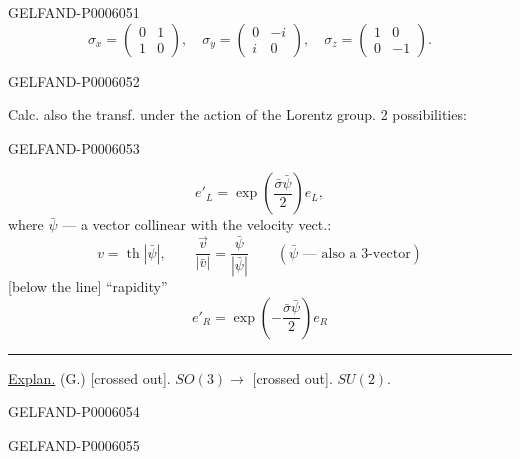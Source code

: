 \begin{GelfandAdjacentEvidence}{GELFAND-P000605}{1}
\[
\sigma_x=\begin{pmatrix}0&1\\1&0\end{pmatrix},\quad
\sigma_y=\begin{pmatrix}0&-i\\i&0\end{pmatrix},\quad
\sigma_z=\begin{pmatrix}1&0\\0&-1\end{pmatrix}.
\]
\end{GelfandAdjacentEvidence}
\begin{GelfandAdjacentEvidence}{GELFAND-P000605}{2}

Calc. also the transf. under the action of the Lorentz group. 2 possibilities:
\end{GelfandAdjacentEvidence}
\begin{GelfandAdjacentEvidence}{GELFAND-P000605}{3}

\[
e'_L=\exp\left(\frac{\bar\sigma\bar\psi}{2}\right)e_L,
\]
where \(\bar\psi\) — a vector collinear with the velocity vect.:
\[
v=\operatorname{th}|\bar\psi|,\qquad
\frac{\vec v}{|\bar v|}=\frac{\bar\psi}{|\bar\psi|}
\qquad(\bar\psi\text{ — also a 3-vector})
\]
[below the line] “rapidity”
\[
e'_R=\exp\left(-\frac{\bar\sigma\bar\psi}{2}\right)e_R
\]
\rule{.21\linewidth}{.4pt}\par
\underline{Explan.} (G.) [crossed out]. \(SO(3)\longrightarrow\)
[crossed out]. \(SU(2)\).
\end{GelfandAdjacentEvidence}
\begin{GelfandAdjacentEvidence}{GELFAND-P000605}{4}

\end{GelfandAdjacentEvidence}
\begin{GelfandAdjacentEvidence}{GELFAND-P000605}{5}

\end{GelfandAdjacentEvidence}
